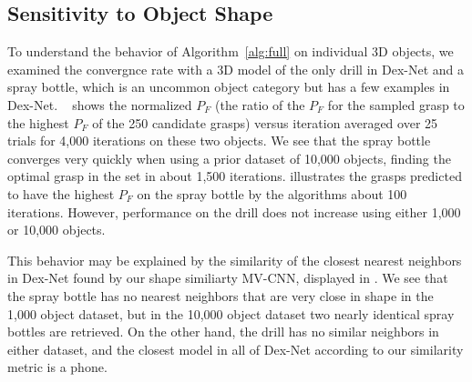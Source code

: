 \subsection{Sensitivity to Object Shape}
To understand the behavior of Algorithm~\ref{alg:full} on individual 3D objects, we examined the convergnce rate with a 3D model of the only drill in Dex-Net and a spray bottle, which is an uncommon object category but has a few examples in Dex-Net.
~ shows the normalized $P_F$ (the ratio of the $P_F$ for the sampled grasp to the highest $P_F$ of the 250 candidate grasps) versus iteration averaged over 25 trials for 4,000 iterations on these two objects.
We see that the spray bottle converges very quickly when using a prior dataset of 10,000 objects, finding the optimal grasp in the set in about 1,500 iterations.
 illustrates the grasps predicted to have the highest $P_F$ on the spray bottle by the algorithms about 100 iterations.
However, performance on the drill does not increase using either 1,000 or 10,000 objects.

This behavior may be explained by the similarity of the closest nearest neighbors in Dex-Net found by our shape similiarty MV-CNN, displayed in .
We see that the spray bottle has no nearest neighbors that are very close in shape in the 1,000 object dataset, but in the 10,000 object dataset two nearly identical spray bottles are retrieved.
On the other hand, the drill has no similar neighbors in either dataset, and the closest model in all of Dex-Net according to our similarity metric is a phone.

